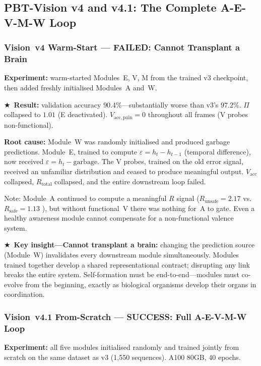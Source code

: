 \documentclass[12pt,a4paper]{article}
\newcommand{\Rtot}{R_{\mathrm{total}}}
\newcommand{\starred}{\textbf{\textcolor{pbtblue}{$\bigstar$}}~}
\begin{document}
\subsection{PBT-Vision v4 and v4.1: The Complete A-E-V-M-W Loop}

\subsubsection{Vision~v4 Warm-Start --- FAILED: Cannot Transplant a Brain}

\textbf{Experiment:} warm-started Modules~E, V, M from the trained v3
checkpoint, then added freshly initialised Modules~A and~W.

\starred\textbf{Result:} validation accuracy $90.4\%$---substantially worse
than v3's $97.2\%$. $\Pi$ collapsed to $1.01$ (E deactivated).
$V_{\mathrm{acc,pain}} = 0$ throughout all frames (V probes non-functional).

\textbf{Root cause:} Module~W was randomly initialised and produced garbage
predictions. Module~E, trained to compute $\varepsilon = h_t - h_{t-1}$
(temporal difference), now received $\varepsilon = h_t - \mathrm{garbage}$.
The V probes, trained on the old error signal, received an unfamiliar
distribution and ceased to produce meaningful output. $V_{\mathrm{acc}}$
collapsed, $\Rtot$ collapsed, and the entire downstream loop failed.

Note: Module~A continued to compute a meaningful $R$ signal
($R_{\mathrm{unsafe}} = 2.17$ vs.\ $R_{\mathrm{safe}} = 1.13$ \checkmark),
but without functional~V there was nothing for~A to gate. Even a healthy
awareness module cannot compensate for a non-functional valence system.

\starred\textbf{Key insight---Cannot transplant a brain:} changing the
prediction source (Module~W) invalidates every downstream module
simultaneously. Modules trained together develop a shared representational
contract; disrupting any link breaks the entire system. Self-formation must be
end-to-end---modules must co-evolve from the beginning, exactly as biological
organisms develop their organs in coordination.

\subsubsection{Vision~v4.1 From-Scratch --- SUCCESS: Full A-E-V-M-W Loop}

\textbf{Experiment:} all five modules initialised randomly and trained jointly
from scratch on the same dataset as v3 (1,550 sequences). A100 80GB, 40
epochs.
\end{document}
